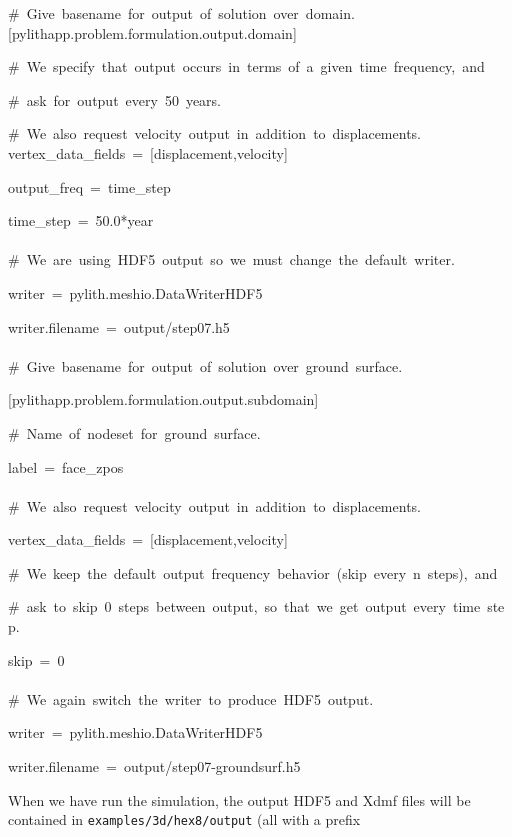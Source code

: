 \begin{lyxcode}
\#~Give~basename~for~output~of~solution~over~domain.~\\
{[}pylithapp.problem.formulation.output.domain{]}

\#~We~specify~that~output~occurs~in~terms~of~a~given~time~frequency,~and

\#~ask~for~output~every~50~years.

\#~We~also~request~velocity~output~in~addition~to~displacements.~\\
vertex\_data\_fields~=~{[}displacement,velocity{]}

output\_freq~=~time\_step

time\_step~=~50.0{*}year~\\
~\\


\#~We~are~using~HDF5~output~so~we~must~change~the~default~writer.

writer~=~pylith.meshio.DataWriterHDF5

writer.filename~=~output/step07.h5~\\
~\\


\#~Give~basename~for~output~of~solution~over~ground~surface.

{[}pylithapp.problem.formulation.output.subdomain{]}

\#~Name~of~nodeset~for~ground~surface.

label~=~face\_zpos~\\
~\\


\#~We~also~request~velocity~output~in~addition~to~displacements.

vertex\_data\_fields~=~{[}displacement,velocity{]}

\#~We~keep~the~default~output~frequency~behavior~(skip~every~n~steps),~and

\#~ask~to~skip~0~steps~between~output,~so~that~we~get~output~every~time~step.

skip~=~0~\\
~\\


\#~We~again~switch~the~writer~to~produce~HDF5~output.

writer~=~pylith.meshio.DataWriterHDF5

writer.filename~=~output/step07-groundsurf.h5
\end{lyxcode}
When we have run the simulation, the output HDF5 and Xdmf files will
be contained in \texttt{examples/3d/hex8/output} (all with a prefix
